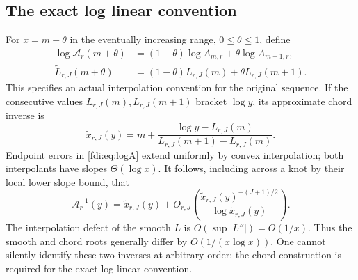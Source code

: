 \documentclass[11pt,letterpaper]{article}
\theoremstyle{remark}\newtheorem{remark}[theorem]{Remark}
\begin{document}
\subsection{The exact log linear convention}
For $x=m+\theta$ in the eventually increasing range, $0\le\theta\le1$, define
\begin{align*}
 \log\mathcal A_r(m+\theta)&=(1-\theta)\log A_{m,r}
                  +\theta\log A_{m+1,r},\\
 \widetilde L_{r,J}(m+\theta)&=(1-\theta)L_{r,J}(m)
                  +\theta L_{r,J}(m+1).
\end{align*}
This specifies an actual interpolation convention for the original sequence. If the consecutive values $L_{r,J}(m),L_{r,J}(m+1)$ bracket $\log y$, its approximate chord inverse is
\begin{equation}\label{fdi:eq:chordinv}
 \widetilde x_{r,J}(y)=m+
 \frac{\log y-L_{r,J}(m)}{L_{r,J}(m+1)-L_{r,J}(m)}.
\end{equation}
Endpoint errors in \eqref{fdi:eq:logA} extend uniformly by convex interpolation; both interpolants have slopes $\Theta(\log x)$. It follows, including across a knot by their local lower slope bound, that
\begin{equation}\label{fdi:eq:actualchordinv}
 \mathcal A_r^{-1}(y)=\widetilde x_{r,J}(y)
 +O_{r,J}\!\left(\frac{\widetilde x_{r,J}(y)^{-(J+1)/2}}
 {\log\widetilde x_{r,J}(y)}\right).
\end{equation}
The interpolation defect of the smooth $L$ is $O(\sup|L''|)=O(1/x)$. Thus the smooth and chord roots generally differ by $O(1/(x\log x))$. One cannot silently identify these two inverses at arbitrary order; the chord construction is required for the exact log-linear convention.
\end{document}
